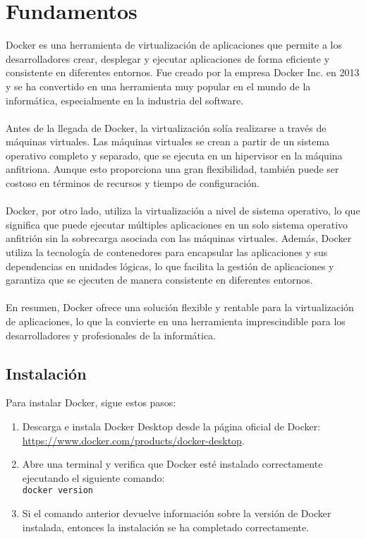 \documentclass{article}
\begin{document}
\section{Fundamentos}
Docker es una herramienta de virtualización de aplicaciones que permite a los desarrolladores crear, desplegar y ejecutar aplicaciones de forma eficiente y consistente en diferentes entornos. Fue creado por la empresa Docker Inc. en 2013 y se ha convertido en una herramienta muy popular en el mundo de la informática, especialmente en la industria del software.
\\
\\
Antes de la llegada de Docker, la virtualización solía realizarse a través de máquinas virtuales. Las máquinas virtuales se crean a partir de un sistema operativo completo y separado, que se ejecuta en un hipervisor en la máquina anfitriona. Aunque esto proporciona una gran flexibilidad, también puede ser costoso en términos de recursos y tiempo de configuración.
\\
\\
Docker, por otro lado, utiliza la virtualización a nivel de sistema operativo, lo que significa que puede ejecutar múltiples aplicaciones en un solo sistema operativo anfitrión sin la sobrecarga asociada con las máquinas virtuales. Además, Docker utiliza la tecnología de contenedores para encapsular las aplicaciones y sus dependencias en unidades lógicas, lo que facilita la gestión de aplicaciones y garantiza que se ejecuten de manera consistente en diferentes entornos.
\\
\\
En resumen, Docker ofrece una solución flexible y rentable para la virtualización de aplicaciones, lo que la convierte en una herramienta imprescindible para los desarrolladores y profesionales de la informática.

\subsection{Instalación}

Para instalar Docker, sigue estos pasos:

\begin{enumerate}
    \item Descarga e instala Docker Desktop desde la página oficial de Docker:\\ 
    \url{https://www.docker.com/products/docker-desktop}.
    \item Abre una terminal y verifica que Docker esté instalado correctamente ejecutando el siguiente comando:\\
          \lstinline{docker version}
    \item Si el comando anterior devuelve información sobre la versión de Docker instalada, entonces la instalación se ha completado correctamente.
\end{enumerate}
\end{document}
